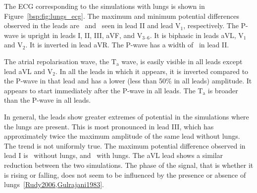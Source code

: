 The ECG corresponding to the simulations with lungs is shown in
Figure~\ref{bsp:fig:lungs_ecg}.
The maximum and minimum potential differences observed in the leads are
\ and \ seen in lead II and lead $\text{V}_{\text{1}}$, respectively.
The P-wave is upright in leads I, II, III, aVF, and $\text{V}_{\text{3--6}}$.
It is biphasic in leads aVL, $\text{V}_{\text{1}}$ and $\text{V}_{\text{2}}$.
It is inverted in lead aVR.
The P-wave has a width of \ in lead II.

The atrial repolarisation wave, the $\text{T}_{\text{a}}$ wave, is easily
visible in all leads except lead aVL and $\text{V}_{\text{2}}$.
In all the leads in which it appears, it is inverted compared to the P-wave in
that lead and has a lower (less than 50\% in all leads) amplitude.
It appears to start immediately after the P-wave in all leads.
The $\text{T}_{\text{a}}$ is broader than the P-wave in all leads.

In general, the leads show greater extremes of potential in the simulations
where the lungs are present.
This is most pronounced in lead III, which has approximately twice the maximum
amplitude of the same lead without lungs.
The trend is not uniformly true.
The maximum potential difference observed in lead I is \ without lungs,
and \ with lungs.
The aVL lead shows a similar reduction between the two simulations.
The phase of the signal, that is whether it is rising or falling, does not seem
to be influenced by the presence or absence of
lungs~\ref{Rudy2006,Gulrajani1983}.
